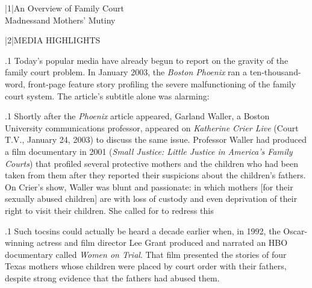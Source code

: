 \documentclass[11pt, twoside]{article}
\begin{document}
\thispagestyle{empty}

{\fontsize{13}{19}\selectfont


\hspace{-5em}\begin{minipage}{1.1\textwidth}
\begin{flushright}
{\fontsize{14}{22}\selectfont
\textbf{%
}
}
\end{flushright}
\end{minipage}


\vspace{6em}





\s|1|{An Overview of Family Court\\\vspace{7pt}\hfill{}Madness\mdash{}and Mothers’ Mutiny}


\s|2|{MEDIA HIGHLIGHTS}

\p.1{%
\noindent{}\:Today’s popular media have already begun to report on the gravity of
the family court problem. In January 2003, the \textit{Boston Phoenix} ran a
ten-thousand-word, front-page feature story profiling the severe malfunctioning of the family court system. The article’s subtitle alone was
alarming: \;
}%

\p.1{%
\:Shortly after the \textit{Phoenix} article appeared, Garland Waller, a Boston
University communications professor, appeared on \textit{Katherine Crier Live}
(Court T.V., January 24, 2003) to discuss the same issue. Professor
Waller had produced a film documentary in 2001 (\textit{Small Justice: Little Justice in America’s Family Courts}) that profiled several protective
mothers and the children who had been taken from them after they reported their suspicions about the children’s fathers. On Crier’s show,
Waller was blunt and passionate:  in which mothers  [for their sexually abused children] are  with loss of custody and even deprivation of their right to
visit their children. She called for  to redress this
\;
}%

\p.1{%
\:Such tocsins could actually be heard a decade earlier when, in 1992,
the Oscar-winning actress and film director Lee Grant produced and
narrated an HBO documentary called \textit{Women on Trial}. That film presented the stories of four Texas mothers whose children were placed by
court order with their fathers, despite strong evidence that the fathers
had abused them.\;
}%

}
\end{document}
